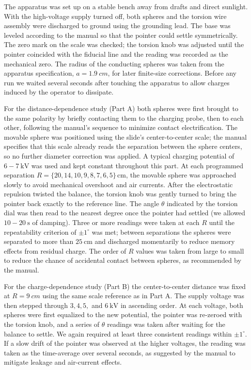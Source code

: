 \documentclass[12pt]{article}
\begin{document}
The apparatus was set up on a stable bench away from drafts and direct sunlight. With the high-voltage supply turned off, both spheres and the torsion wire assembly were discharged to ground using the grounding lead. The base was leveled according to the manual so that the pointer could settle symmetrically. The zero mark on the scale was checked; the torsion knob was adjusted until the pointer coincided with the fiducial line and the reading was recorded as the mechanical zero. The radius of the conducting spheres was taken from the apparatus specification, \(a=\SI{1.9}{cm}\), for later finite-size corrections. Before any run we waited several seconds after touching the apparatus to allow charges induced by the operator to dissipate.

For the distance-dependence study (Part A) both spheres were first brought to the same polarity by briefly contacting them to the charging probe, then to each other, following the manual’s sequence to minimize contact electrification. The movable sphere was positioned using the slide’s center-to-center scale; the manual specifies that this scale already reads the separation between the sphere centers, so no further diameter correction was applied. A typical charging potential of \(6\!-\!7~\mathrm{kV}\) was used and kept constant throughout this part. At each programmed separation \(R=\{20,14,10,9,8,7,6,5\}\,\mathrm{cm}\), the movable sphere was approached slowly to avoid mechanical overshoot and air currents. After the electrostatic repulsion twisted the balance, the torsion knob was gently turned to bring the pointer back exactly to the reference line. The angle \(\theta\) indicated by the torsion dial was then read to the nearest degree once the pointer had settled (we allowed \(10\!-\!20~\mathrm{s}\) of damping). Three or more readings were taken at each \(R\) until the repeatability criterion of \(\pm 1^\circ\) was met; between separations the spheres were separated to more than \(25~\mathrm{cm}\) and discharged momentarily to reduce memory effects from residual charge. The order of \(R\) values was taken from large to small to reduce the chance of accidental contact between spheres, as recommended by the manual.

For the charge-dependence study (Part B) the center-to-center distance was fixed at \(R=\SI{9}{cm}\) using the same scale reference as in Part A. The supply voltage was then stepped through \(3,4,5,\) and \(6~\mathrm{kV}\) in ascending order. At each voltage, both spheres were first equalized to the new potential, the pointer was re-zeroed with the torsion knob, and a series of \(\theta\) readings was taken after waiting for the balance to settle. We again required at least three consistent readings within \(\pm 1^\circ\). If a slow drift of the pointer was observed at the higher voltages, the reading was taken as the time-average over several seconds, as suggested by the manual to mitigate leakage and air-current effects.
\end{document}
